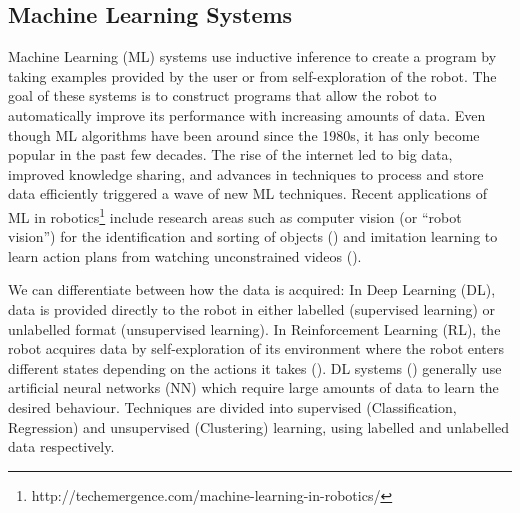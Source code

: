\subsection{Machine Learning Systems}\label{sssec:Learning Systems}
Machine Learning (ML) systems use inductive inference to create a program by taking examples provided by the user or from self-exploration of the robot. 
The goal of these systems is to construct programs that allow the robot to automatically improve its performance with increasing amounts of data. 
Even though ML algorithms have been around since the 1980s, it has only become popular in the past few decades. 
The rise of the internet led to big data, improved knowledge sharing, and advances in techniques to process and store data efficiently triggered a wave of new ML techniques.
Recent applications of ML in robotics\footnote{http://techemergence.com/machine-learning-in-robotics/} include research areas such as computer vision (or ``robot vision'') for the identification and sorting of objects (\cite{stager2013computer}) and imitation learning to learn action plans from watching unconstrained videos (\cite{Yang2015}).

We can differentiate between how the data is acquired: 
In Deep Learning (DL), data is provided directly to the robot in either labelled (supervised learning) or unlabelled format (unsupervised learning).
In Reinforcement Learning (RL), the robot acquires data by self-exploration of its environment where the robot enters different states depending on the actions it takes ().
DL systems (\cite{schmidhuber2015deep}) generally use artificial neural networks (NN) which require large amounts of data to learn the desired behaviour.
Techniques are divided into supervised (\eg Classification, Regression) and unsupervised (\eg Clustering) learning, using labelled and unlabelled data respectively.

